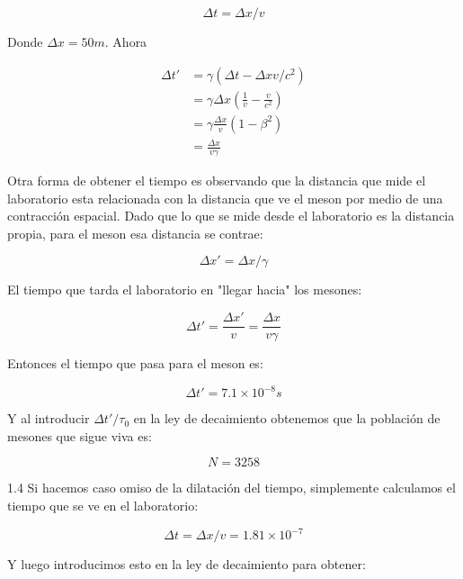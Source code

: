 \documentclass[12pt]{article}
\begin{document}
\begin{equation}
\Delta t = \Delta x/v 
\end{equation}

Donde $\Delta x =50m$. Ahora



\begin{align}
\Delta t' &= \gamma(\Delta t - \Delta x v/c^2)\\
	&= \gamma \Delta x\left(\frac{1}{v} - \frac{v}{c^2}\right)\\
	&= \gamma \frac{\Delta x}{v}\left(1-\beta^2\right)\\
	&= \frac{\Delta x}{v \gamma}
\end{align}

Otra forma de obtener el tiempo es observando que la distancia que mide el laboratorio esta relacionada con la distancia que ve el meson por medio de una contracción espacial. Dado que lo que se mide desde el laboratorio es la distancia propia, para el meson esa distancia se contrae:

\begin{equation}
\Delta  x' = \Delta  x/\gamma
\end{equation}

El tiempo que tarda el laboratorio en "llegar hacia" los mesones:

\begin{equation}
\Delta t' =  \frac{\Delta x'}{v} = \frac{\Delta x}{v \gamma}
\end{equation}

Entonces el tiempo que pasa para el meson es:

\begin{equation}
\Delta t' = 7.1 \times 10^{-8} s
\end{equation}

Y al introducir $\Delta t'/\tau_0$ en la ley de decaimiento obtenemos que la población de mesones que sigue viva es:

\begin{equation}
N  = 3258
\end{equation}


1.4 Si hacemos caso omiso de la dilatación del tiempo, simplemente calculamos el tiempo que se ve en el laboratorio:


\begin{equation}
\Delta t = \Delta x/v = 1.81 \times 10^{-7}
\end{equation}

Y luego introducimos esto en la ley de decaimiento para obtener:
\end{document}
